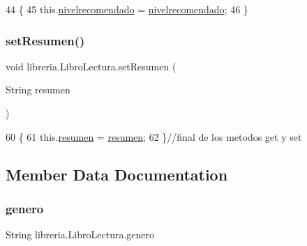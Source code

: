 \begin{DoxyCode}
44                                                              \{
45         this.\mbox{\hyperlink{classlibreria_1_1_libro_lectura_a4a163e246538be335d80d56a699bde4c}{nivelrecomendado}} = \mbox{\hyperlink{classlibreria_1_1_libro_lectura_a4a163e246538be335d80d56a699bde4c}{nivelrecomendado}};
46     \}
\end{DoxyCode}
\mbox{\label{classlibreria_1_1_libro_lectura_a4fdc0bff168769f232f0fd59e90f8395}} 
\subsubsection{\texorpdfstring{set\+Resumen()}{setResumen()}}
{\footnotesize\ttfamily void libreria.\+Libro\+Lectura.\+set\+Resumen (\begin{DoxyParamCaption}\item[{String}]{resumen }\end{DoxyParamCaption})\hspace{0.3cm}{\ttfamily [inline]}}


\begin{DoxyCode}
60                                            \{
61         this.\mbox{\hyperlink{classlibreria_1_1_libro_lectura_aadbf8eecd32ed6a6dee9202873762707}{resumen}} = \mbox{\hyperlink{classlibreria_1_1_libro_lectura_aadbf8eecd32ed6a6dee9202873762707}{resumen}};
62     \}\textcolor{comment}{//final de los metodos get y set}
\end{DoxyCode}


\subsection{Member Data Documentation}
\mbox{\label{classlibreria_1_1_libro_lectura_a165e12f15d25aab5fd957ebf42ad9458}} 
\subsubsection{\texorpdfstring{genero}{genero}}
{\footnotesize\ttfamily String libreria.\+Libro\+Lectura.\+genero\hspace{0.3cm}{\ttfamily [private]}}

